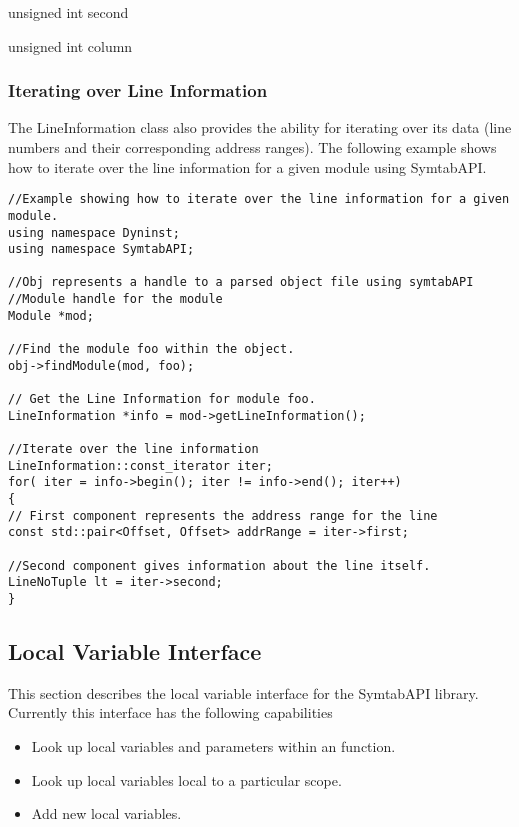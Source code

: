 \begin{apient}
unsigned int second
\end{apient}

\begin{apient}
unsigned int column
\end{apient}

\subsubsection{Iterating over Line Information}
The LineInformation class also provides the ability for iterating over its data (line numbers and their corresponding address ranges). The following example shows how to iterate over the line information for a given module using SymtabAPI.

\begin{lstlisting}
//Example showing how to iterate over the line information for a given module.
using namespace Dyninst;
using namespace SymtabAPI;

//Obj represents a handle to a parsed object file using symtabAPI
//Module handle for the module
Module *mod;

//Find the module foo within the object.
obj->findModule(mod, foo);

// Get the Line Information for module foo.
LineInformation *info = mod->getLineInformation();

//Iterate over the line information
LineInformation::const_iterator iter;
for( iter = info->begin(); iter != info->end(); iter++)
{
// First component represents the address range for the line
const std::pair<Offset, Offset> addrRange = iter->first;

//Second component gives information about the line itself.
LineNoTuple lt = iter->second;
}
\end{lstlisting}

\subsection{Local Variable Interface}

This section describes the local variable interface for the SymtabAPI library. Currently this interface has the following capabilities
\begin{itemize}
    \item Look up local variables and parameters within an function.
    \item Look up local variables local to a particular scope.
    \item Add new local variables.
\end{itemize}

